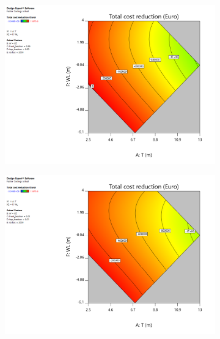 \begin{figure}[h]
    \centering
    \begin{subfigure}[b]{0.475\textwidth}   
        \centering 
        \includegraphics[width=\textwidth]{figures/ComFLOW/Results DI1/costs/T_WL_Costs_total_reduction_box_png.png}
        \caption[]%
        {{\small }}    
        \label{fig: opt }
    \end{subfigure}
    \hfill
    \begin{subfigure}[b]{0.475\textwidth}   
        \centering 
        \includegraphics[width=\textwidth]{figures/ComFLOW/Results DI1/costs/T_WL_Costs_total_reduction_wedge_png.png}
        \caption[]%
        {{\small }}    
        \label{fig: opt }
    \end{subfigure}
    \caption{}
    \label{fig: }
\end{figure}

